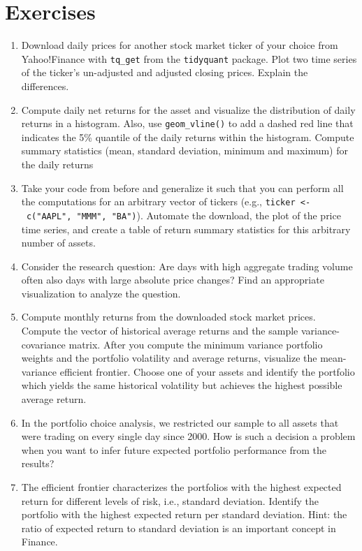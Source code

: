 \documentclass[
]{krantz}
\providecommand{\tightlist}{%
  \setlength{\itemsep}{0pt}\setlength{\parskip}{0pt}}
\begin{document}
\hypertarget{exercises}{%
\section{Exercises}\label{exercises}}

\begin{enumerate}
\def\labelenumi{\arabic{enumi}.}
\tightlist
\item
  Download daily prices for another stock market ticker of your choice from Yahoo!Finance with \texttt{tq\_get} from the \texttt{tidyquant} package. Plot two time series of the ticker's un-adjusted and adjusted closing prices. Explain the differences.
\item
  Compute daily net returns for the asset and visualize the distribution of daily returns in a histogram. Also, use \texttt{geom\_vline()} to add a dashed red line that indicates the 5\% quantile of the daily returns within the histogram. Compute summary statistics (mean, standard deviation, minimum and maximum) for the daily returns
\item
  Take your code from before and generalize it such that you can perform all the computations for an arbitrary vector of tickers (e.g., \texttt{ticker\ \textless{}-\ c("AAPL",\ "MMM",\ "BA")}). Automate the download, the plot of the price time series, and create a table of return summary statistics for this arbitrary number of assets.
\item
  Consider the research question: Are days with high aggregate trading volume often also days with large absolute price changes? Find an appropriate visualization to analyze the question.
\item
  Compute monthly returns from the downloaded stock market prices. Compute the vector of historical average returns and the sample variance-covariance matrix. After you compute the minimum variance portfolio weights and the portfolio volatility and average returns, visualize the mean-variance efficient frontier. Choose one of your assets and identify the portfolio which yields the same historical volatility but achieves the highest possible average return.
\item
  In the portfolio choice analysis, we restricted our sample to all assets that were trading on every single day since 2000. How is such a decision a problem when you want to infer future expected portfolio performance from the results?
\item
  The efficient frontier characterizes the portfolios with the highest expected return for different levels of risk, i.e., standard deviation. Identify the portfolio with the highest expected return per standard deviation. Hint: the ratio of expected return to standard deviation is an important concept in Finance.
\end{enumerate}
\end{document}
